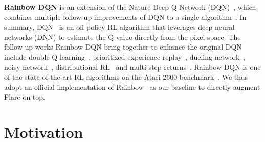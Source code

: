 \documentclass{article} \usepackage{iclr2021_conference,times}
\begin{document}
\textbf{Rainbow DQN} is an extension of the Nature Deep Q Network (DQN)~\citep{mnih2015human}, which combines multiple follow-up improvements of DQN to a single algorithm~\citep{hessel2017rainbow}. In summary, DQN~\citep{mnih2015human} is an off-policy RL algorithm that leverages deep neural networks (DNN) to estimate the Q value directly from the pixel space. The follow-up works Rainbow DQN bring together to enhance the original DQN include double Q learning~\citep{hasselt2010double}, prioritized experience replay~\citep{schaul2015prioritized}, dueling network~\citep{wang2016dueling}, noisy network~\citep{fortunato2017noisy}, distributional RL~\citep{bellemare2017distributional} and multi-step returns~\citep{SuttonBook}. Rainbow DQN is one of the state-of-the-art RL algorithms on the Atari 2600 benchmark~\citep{bellemare2013arcade}. We thus adopt an official implementation of Rainbow~\citep{dqnzoo2020github} as our baseline to directly augment Flare on top.
\fi 
\section{Motivation}
\label{sec:motivation} 
\end{document}
